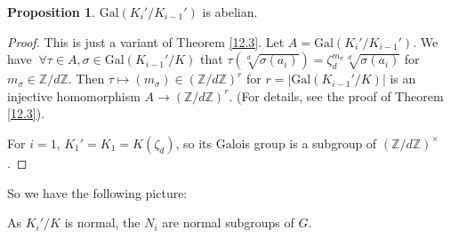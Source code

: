 \documentclass{article}
\theoremstyle{definition}
\newtheorem{prop}[theorem]{Proposition}
\begin{document}

\begin{prop}
    $\text{Gal}(K_i'/K_{i-1}')$ is abelian.
\end{prop}
\begin{proof}
    This is just a variant of Theorem \ref{12.3}. Let $A=\text{Gal}(K_i'/K_{i-1}')$. We have $~\forall \tau \in A, \sigma \in \text{Gal}(K_{i-1}'/K)$ that $\tau\left(\sqrt[d]{\sigma(a_i)}\right)=\zeta_d^{m_{\sigma}}\sqrt[d]{\sigma(a_i)}$ for $m_\sigma \in \mathbb{Z}/d\mathbb{Z}$. Then $\tau \mapsto (m_\sigma)\in (\mathbb{Z}/d\mathbb{Z})^r$ for $r = |\text{Gal}(K_{i-1}'/K)|$ is an injective homomorphism $A \to (\mathbb{Z}/d\mathbb{Z})^r$. (For details, see the proof of Theorem \ref{12.3}).
    \vspace{1mm}
    
    For $i=1$, $K_1'=K_1=K(\zeta_d)$, so its Galois group is a subgroup of $(\mathbb{Z}/d\mathbb{Z})^\times$.
\end{proof}
So we have the following picture:
\begin{figure}[H]
    \centering
\end{figure}
As $K_i'/K$ is normal, the $N_i$ are normal subgroups of $G$.
\end{document}
